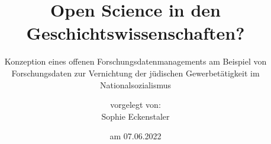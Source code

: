 \titlehead{Humboldt-Universität zu Berlin\\
Philosophische Fakultät\\
Institut für Geschichtswissenschaften\vspace*{4cm}}
\subject{Masterarbeit}
\title{Open Science in den Geschichtswissenschaften?}
\subtitle{Konzeption eines offenen Forschungsdatenmanagements am Beispiel von Forschungsdaten zur Vernichtung der jüdischen Gewerbetätigkeit im Nationalsozialismus}
\author{vorgelegt von:\\Sophie Eckenstaler}
\date{am 07.06.2022\vspace*{3.7cm}}
\publishers{\normalsize
Erstbetreuer: Prof. Dr. Rüdiger Hohls, Institut für Geschichtswissenschaften, HU Berlin\\ 
Zweitbetreuer: Prof. Dr. Michael Wildt, Institut für Geschichtswissenschaften, HU Berlin\\
Studiengang: Master of Arts, Geschichtswissenschaften, Schwerpunkt: Digital History\\
Matrikelnr.: 596272\\
E-Mail: sophie.eckenstaler@hu-berlin.de\\
Eberswalde, den 7. Juni 2022
}


